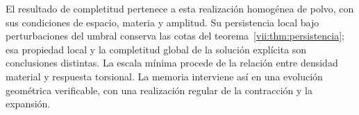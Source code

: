 El resultado de completitud pertenece a esta realización homogénea de
polvo, con sus condiciones de espacio, materia y amplitud. Su
persistencia local bajo perturbaciones del umbral conserva las cotas
del teorema~\ref{vii:thm:persistencia}; esa propiedad local y la
completitud global de la solución explícita son conclusiones distintas.
La escala mínima procede de la relación entre densidad material y
respuesta torsional. La memoria interviene así en una evolución
geométrica verificable, con una realización regular de la contracción
y la expansión.
